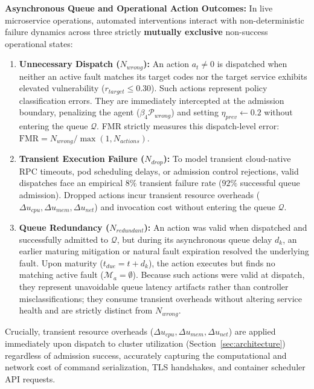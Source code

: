 \documentclass[11pt,a4paper]{article}
\begin{document}
\textbf{Asynchronous Queue and Operational Action Outcomes:} In live microservice operations, automated interventions interact with non-deterministic failure dynamics across three strictly \textbf{mutually exclusive} non-success operational states:
\begin{enumerate}
    \item \textbf{Unnecessary Dispatch ($N_{wrong}$):} An action $a_t \ne 0$ is dispatched when neither an active fault matches its target codes nor the target service exhibits elevated vulnerability ($r_{target} \le 0.30$). Such actions represent policy classification errors. They are immediately intercepted at the admission boundary, penalizing the agent ($\beta_4 \mathcal{P}_{wrong}$) and setting $\eta_{prev} \leftarrow 0.2$ without entering the queue $\mathcal{Q}$. FMR strictly measures this dispatch-level error: $\text{FMR} = N_{wrong} / \max(1, N_{actions})$.
    \item \textbf{Transient Execution Failure ($N_{drop}$):} To model transient cloud-native RPC timeouts, pod scheduling delays, or admission control rejections, valid dispatches face an empirical $8\%$ transient failure rate ($92\%$ successful queue admission). Dropped actions incur transient resource overheads ($\Delta u_{cpu}, \Delta u_{mem}, \Delta u_{net}$) and invocation cost without entering the queue $\mathcal{Q}$.
    \item \textbf{Queue Redundancy ($N_{redundant}$):} An action was valid when dispatched and successfully admitted to $\mathcal{Q}$, but during its asynchronous queue delay $d_k$, an earlier maturing mitigation or natural fault expiration resolved the underlying fault. Upon maturity ($t_{due} = t + d_k$), the action executes but finds no matching active fault ($\mathcal{M}_a = \emptyset$). Because such actions were valid at dispatch, they represent unavoidable queue latency artifacts rather than controller misclassifications; they consume transient overheads without altering service health and are strictly distinct from $N_{wrong}$.
\end{enumerate}
Crucially, transient resource overheads ($\Delta u_{cpu}, \Delta u_{mem}, \Delta u_{net}$) are applied immediately upon dispatch to cluster utilization (Section~\ref{sec:architecture}) regardless of admission success, accurately capturing the computational and network cost of command serialization, TLS handshakes, and container scheduler API requests.
\end{document}
